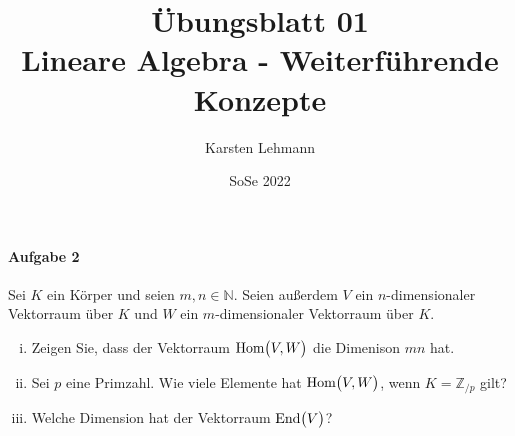 \documentclass{scrreprt}
\author{Karsten Lehmann}
\date{SoSe 2022}
\title{Übungsblatt 01\\Lineare Algebra - Weiterführende Konzepte}
\newcommand\End{\text{End}}
\newcommand\Hom{\text{Hom}}
\begin{document}
\paragraph{Aufgabe 2} Sei $K$ ein Körper und seien $m, n \in \mathbb{N}$.
Seien außerdem $V$ ein $n$-dimensionaler Vektorraum über $K$ und $W$ ein
$m$-dimensionaler Vektorraum über $K$.

\begin{enumerate}[(i)]
\item Zeigen Sie, dass der Vektorraum $\Hom\qty\big(V, W)$ die Dimenison
  $mn$ hat.
\item Sei $p$ eine Primzahl.
  Wie viele Elemente hat $\Hom\qty\big(V, W)$, wenn $K = \mathbb{Z}_{/p}$ gilt?
\item Welche Dimension hat der Vektorraum $\End\qty\big(V)$?
\end{enumerate}
\end{document}
